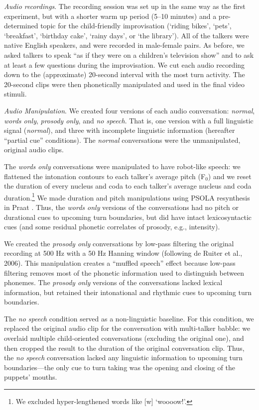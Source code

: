\documentclass[authoryear, 12pt]{elsarticle}
\begin{document}
\textit{Audio recordings}. The recording session was set up in the same way as the first experiment, but with a shorter warm up period (5--10 minutes) and a pre-determined topic for the child-friendly improvisation (`riding bikes', `pets', `breakfast', `birthday cake', `rainy days', or `the library'). All of the talkers were native English speakers, and were recorded in male-female pairs. As before, we asked talkers to speak ``as if they were on a children's television show'' and to ask at least a few questions during the improvisation. We cut each audio recording down to the (approximate) 20-second interval with the most turn activity. The 20-second clips were then phonetically manipulated and used in the final video stimuli.

\textit{Audio Manipulation}. We created four versions of each audio conversation: \textit{normal}, \textit{words only}, \textit{prosody only}, and \textit{no speech}. That is, one version with a full linguistic signal (\textit{normal}), and three with incomplete linguistic information (hereafter ``partial cue'' conditions). The \textit{normal} conversations were the unmanipulated, original audio clips.

The \textit{words only} conversations were manipulated to have robot-like speech: we flattened the intonation contours to each talker's average pitch (F$_{0}$) and we reset the duration of every nucleus and coda to each talker's average nucleus and coda duration.\footnote{We excluded hyper-lengthened words like [w] `woooow!'.} We made duration and pitch manipulations using PSOLA resynthesis in Praat \citep{Praat}. Thus, the \textit{words only} versions of the conversations had no pitch or durational cues to upcoming turn boundaries, but did have intact lexicosyntactic cues (and some residual phonetic correlates of prosody, e.g., intensity).

We created the \textit{prosody only} conversations by low-pass filtering the original recording at 500 Hz with a 50 Hz Hanning window (following de Ruiter et al., 2006). This manipulation creates a ``muffled speech'' effect because low-pass filtering removes most of the phonetic information used to distinguish between phonemes. The \textit{prosody only} versions of the conversations lacked lexical information, but retained their intonational and rhythmic cues to upcoming turn boundaries.

The \textit{no speech} condition served as a non-linguistic baseline. For this condition, we replaced the original audio clip for the conversation with multi-talker babble: we overlaid multiple child-oriented conversations (excluding the original one), and then cropped the result to the duration of the original conversation clip. Thus, the \textit{no speech} conversation lacked any linguistic information to upcoming turn boundaries---the only cue to turn taking was the opening and closing of the puppets' mouths.
\end{document}
